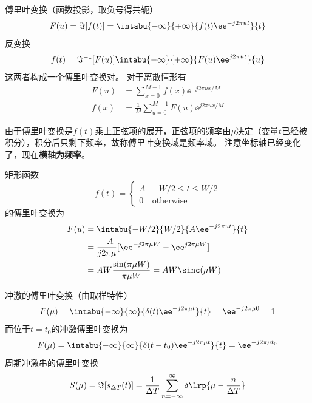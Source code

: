 \begin{definition}[傅里叶变换与反变换]
傅里叶变换（函数投影，取负号得共轭）
\[F(u)=\Im[f(t)]=\intabu{-\infty}{+\infty}{f(t)\ee^{-j 2\pi ut}}{t}\]
反变换
\[f(t)=\Im^{-1}[F(u)]\intabu{-\infty}{+\infty}{F(u)\ee^{j 2\pi ut}}{u}\]
这两者构成一个傅里叶变换对。
对于离散情形有
\[\begin{aligned}
F(u)&=\sum_{x=0}^{M-1}f(x)\ee^{-j2\pi ux/M}\\
f(x)&=\frac{1}{M}\sum_{u=0}^{M-1}F(u)\ee^{j2\pi ux/M}
\end{aligned}\]
\end{definition}
由于傅里叶变换是$f(t)$乘上正弦项的展开，正弦项的频率由$\mu$决定（变量$t$已经被积分），积分后只剩下频率，故称傅里叶变换域是频率域。
注意坐标轴已经变化了，现在\textbf{横轴为频率}。

\begin{example}
矩形函数
\[f(t)=\begin{cases}
A & -W/2\leq t\leq W/2\\
0 & \text{otherwise}
\end{cases}\]
的傅里叶变换为
\[\begin{aligned}
F(u)&=\intabu{-W/2}{W/2}{A\ee^{-j2\pi ut}}{t}\\
&=\frac{-A}{j2\pi\mu}[\ee^{-j2\pi\mu W}-\ee^{j2\pi\mu W}]\\
&=AW\frac{\sin(\pi\mu W)}{\pi\mu W}=AW\sinc(\mu W)
\end{aligned}\]
\end{example}
\begin{example}
冲激的傅里叶变换（由取样特性）
\[F(\mu)=\intabu{-\infty}{\infty}{\delta(t)\ee^{-j2\pi\mu t}}{t}=\ee^{-j2\pi\mu 0}=1\]
而位于$t=t_0$的冲激傅里叶变换为
\[F(\mu)=\intabu{-\infty}{\infty}{\delta(t-t_0)\ee^{-j2\pi\mu t}}{t}=\ee^{-j2\pi\mu t_0}\]
周期冲激串的傅里叶变换
\[S(\mu)=\Im[s_{\Delta T}(t)]=\frac{1}{\Delta T}\sum_{n=-\infty}^{\infty}\delta\lrp{\mu-\frac{n}{\Delta T}}\]
\end{example}

